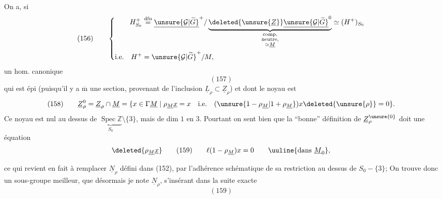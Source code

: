 On a, si
\[
(156)\qquad\left\{
\begin{aligned}
H^+_{S_0}&\overset{\mathrm{dfn}}{=}
\underline{\unsure{\mathcal G|\widetilde G}}^{+}/
\underbrace{\deleted{\unsure{\underline Z}}\underline{\unsure{\mathcal G|\widetilde G}}^{0}}_{\substack{\text{comp.}\\\text{neutre,}\\\simeq\underline M}}
\simeq(H^+)_{S_0}\\
\text{i.e.}\quad H^+&=\unsure{\mathcal G|\widetilde G}^{+}/M,
\end{aligned}\right.
\]
un hom. canonique
\[
(157)
\]
qui est épi (puisqu'il y a $\overline{\mathrm m}$ une section, provenant de l'inclusion $\underline L_\rho\subset\underline Z_\rho$) et dont le noyau est
\[
(158)\qquad
\underline Z_\rho^0=\underline Z_\rho\cap\underline M
=\{x\in\Gamma\underline M\mid\rho_{\underline M}\underline x=x\quad\text{i.e.}\quad(\unsure{1-\rho_{\underline M}|1+\rho_{\underline M}})x\deleted{\unsure{\rho}}=0\}.
\]
Ce noyau est nul au dessus de $\underbrace{\operatorname{Spec}\mathbb Z}_{S_0}\setminus\{3\}$,
mais de dim $1$ en  $3$. Pourtant on sent bien que la ``bonne'' définition de $\underline Z_\rho^{\unsure{0}}$  doit  une équation
\[
\deleted{\rho_{\underline M}\underline x}\qquad
(159)\qquad \ell(1-\rho_{\underline M})x=0\qquad\uuline{\text{dans }\underline M_0},
\]


ce qui revient en fait  à remplacer $\underline N_\rho$ défini dans (152), par l'adhérence schématique de sa restriction au dessus de $S_0-\{3\}$; On trouve donc un sous-groupe meilleur, que désormais je note $\underline N_\rho$, s'insérant dans la suite exacte
\[
(159)
\]

